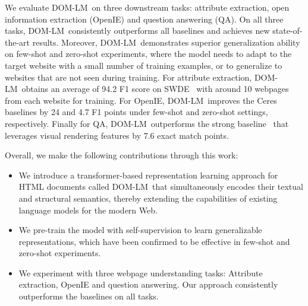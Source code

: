 \documentclass[sigconf, nonacm]{acmart}
\newcommand{\ours}[0]{DOM-LM}
\newcommand{\prashant}[1]{{\color{blue} [PS: #1]}}
\newcommand{\hs}[1]{{\color{cyan} [HS: #1]}}
\newcommand{\nop}[1]{}
\begin{document}
We evaluate \ours\ on three downstream tasks: attribute extraction, open information extraction (OpenIE) and question answering (QA). On all three tasks, \ours\ consistently outperforms all baselines and achieves new state-of-the-art results. Moreover, \ours\ demonstrates superior generalization ability on few-shot and zero-shot experiments, where the model needs to adapt to the target website with a small number of training examples, or to generalize to websites that are not seen during training. For attribute extraction, \ours\ obtains an average of 94.2 F1 score on SWDE~\cite{swde} with around 10 webpages from each website for training. For OpenIE, \ours\ improves the Ceres~\cite{lockard-etal-2019-openceres, lockard-etal-2020-zeroshotceres} baselines by 24 and 4.7 F1 points under few-shot and zero-shot settings, respectively. Finally for QA, \ours\ outperforms the strong baseline~\cite{chen2021websrc} that leverages visual rendering features by 7.6 exact match points.\nop{We can perhaps give a one-line summary as a glimpse of our results (i.e \% improvement on each of the tasks w/ and w/o \ours{})}
\nop{\prashant{I think this paragraph is about details which can be omitted in the Introduction.} For Attribute extraction, we use the publicly available SWDE dataset \hs{You mentioned that the pre-training set is the same as this,  but without labels. Then our model would have seen the webpages used in testing set? Is it fair for other methods?} \prashant{I agree: needs justification or clarification}, and a new corpus we collected with a more diverse and noisier set of webpages to simulate real-world use cases. For OpenIE, we use the extended version of the SWDE data, which additionally annotates three verticals in SWDE with (subject, predicate, object) triples. For both attribute extraction and OpenIE, we focus on few-shot or zero-shot experiments with few or no labels available for the target site or vertical. This is closer to the real-world scenario where it is cost-prohibitive to have large amounts of training labels with the exponential growth of webpages.}

Overall, we make the following contributions through this work:
\begin{itemize}
    \item {We introduce a transformer-based representation learning approach for HTML documents called \ours\ that simultaneously encodes their textual and structural semantics, thereby extending the capabilities of existing language models for the modern Web.}
    \item We pre-train the model with self-supervision to learn generalizable representations, which have been confirmed to be effective in few-shot and zero-shot experiments.
    \item We experiment with three webpage understanding tasks: Attribute extraction, OpenIE and question answering. Our approach consistently outperforms the baselines on all tasks.
\end{itemize}
\end{document}
